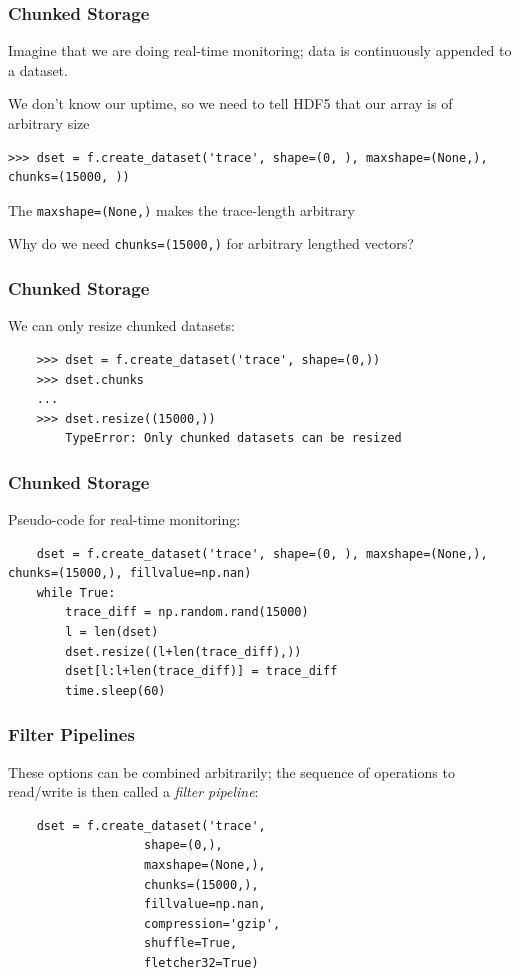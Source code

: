 \documentclass[9pt]{beamer}
\begin{document}
\begin{frame}[fragile]
\frametitle{Chunked Storage}
Imagine that we are doing real-time monitoring; data is continuously appended to a dataset.

We don't know our uptime, so we need to tell HDF5 that our array is of arbitrary size
\begin{verbatim}
>>> dset = f.create_dataset('trace', shape=(0, ), maxshape=(None,), chunks=(15000, ))
\end{verbatim}
The \texttt{maxshape=(None,)} makes the trace-length arbitrary

Why do we need \texttt{chunks=(15000,)} for arbitrary lengthed vectors?
\end{frame}


\begin{frame}[fragile]
  \frametitle{Chunked Storage}
  We can only resize chunked datasets:
  \begin{verbatim}
    >>> dset = f.create_dataset('trace', shape=(0,))
    >>> dset.chunks
    ...
    >>> dset.resize((15000,))
        TypeError: Only chunked datasets can be resized
  \end{verbatim}
\end{frame}

\begin{frame}[fragile]
  \frametitle{Chunked Storage}
  Pseudo-code for real-time monitoring:
  \begin{verbatim}
    dset = f.create_dataset('trace', shape=(0, ), maxshape=(None,), chunks=(15000,), fillvalue=np.nan)
    while True:
        trace_diff = np.random.rand(15000)
        l = len(dset)
        dset.resize((l+len(trace_diff),))
        dset[l:l+len(trace_diff)] = trace_diff
        time.sleep(60)
  \end{verbatim}
\end{frame}

\begin{frame}[fragile]
  \frametitle{Filter Pipelines}
  These options can be combined arbitrarily; the sequence of operations to read/write is then called a \emph{filter pipeline}:
  \begin{verbatim}
    dset = f.create_dataset('trace',
                   shape=(0,),
                   maxshape=(None,),
                   chunks=(15000,),
                   fillvalue=np.nan,
                   compression='gzip',
                   shuffle=True,
                   fletcher32=True)
  \end{verbatim}
\end{frame}
\end{document}
